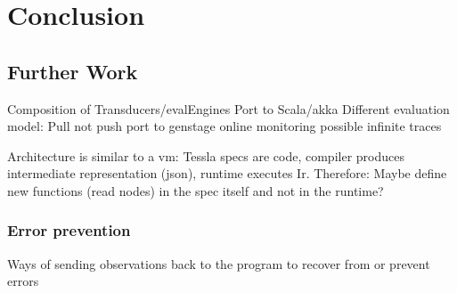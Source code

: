 %
\chapter{Conclusion}
\label{sec:conclusion}

\section{Further Work}
\label{sec:conclusion:further_work}

Composition of Transducers/evalEngines
Port to Scala/akka
Different evaluation model: Pull not push
port to genstage
online monitoring
possible infinite traces

Architecture is similar to a vm: Tessla specs are code, compiler produces intermediate representation (json), runtime executes Ir.
Therefore: Maybe define new functions (read nodes) in the spec itself and not in the runtime?

\subsection{Error prevention}
\label{sec:conclusion:further_work:error_prevention}
Ways of sending observations back to the program to recover from or prevent errors

